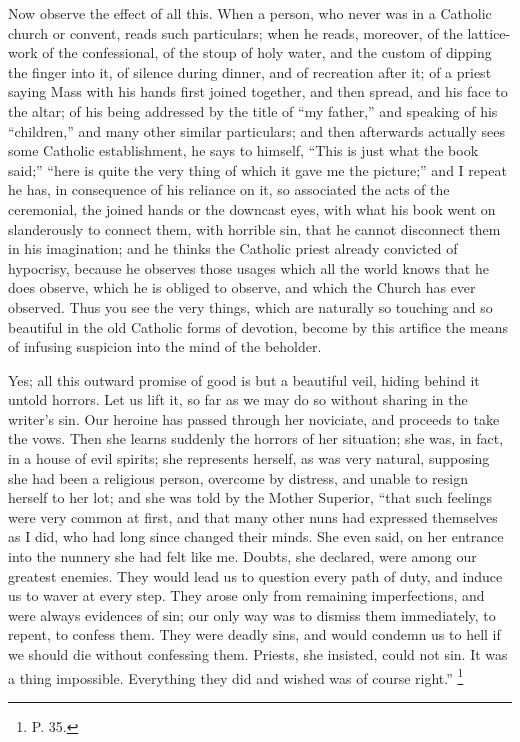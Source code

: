 Now observe the effect of all this. When a person, who
never was in a Catholic church or convent, reads such
particulars; when he reads, moreover, of the lattice-work
of the confessional, of the stoup of holy water, and the
custom of dipping the finger into it, of silence during
dinner, and of recreation after it; of a priest saying
Mass with his hands first joined together, and then
spread, and his face to the altar; of his being addressed
by the title of ``my father,'' and speaking of
his ``children,'' and many other similar
particulars; and then afterwards actually sees some
Catholic establishment, he says to himself, ``This is
just what the book said;'' ``here is quite the
very thing of which it gave me the picture;'' and I
repeat he has, in consequence of his reliance on it, so
associated the acts of the ceremonial, the joined hands
or the downcast eyes, with what his book went on
slanderously to connect them, with horrible sin, that he
cannot disconnect them in his imagination; and he thinks
the Catholic priest already convicted of hypocrisy,
because he observes those usages which all the world
knows that he does observe, which he is obliged to
observe, and which the Church has ever observed. Thus you
see the very things, which are naturally so touching and
so beautiful in the old Catholic forms of devotion,
become by this artifice the means of infusing suspicion
into the mind of the beholder.

Yes; all this outward promise of good is but a
beautiful veil, hiding behind it untold horrors. Let us
lift it, so far as we may do so without sharing in the
writer's sin. Our heroine has passed through her
noviciate, and proceeds to take the vows. Then she learns
suddenly the horrors of her situation; she was, in fact,
in a house of evil spirits; she represents herself, as
was very natural, supposing she had been a religious
person, overcome by distress, and unable to resign
herself to her lot; and she was told by the Mother
Superior, ``that such feelings were very common at
first, and that many other nuns had expressed themselves
as I did, who had long since changed their minds. She
even said, on her entrance into the nunnery she had felt
like me. Doubts, she declared, were among our greatest
enemies. They would lead us to question every path of
duty, and induce us to waver at every step. They arose
only from remaining imperfections, and were always
evidences of sin; our only way was to dismiss them
immediately, to repent, to confess them. They were deadly
sins, and would condemn us to hell if we should die
without confessing them. Priests, she insisted, could not
sin. It was a thing impossible. Everything they did and
wished was of course right.'' \footnote{P. 35.}

